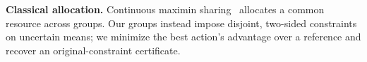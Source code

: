 \par\textbf{Classical allocation.} Continuous maximin sharing~\cite[Sec.~2.2]{Yamada1998Sharing} allocates a common resource across groups. Our groups instead impose disjoint, two-sided constraints on uncertain means; we minimize the best action's advantage over a reference and recover an original-constraint certificate.
